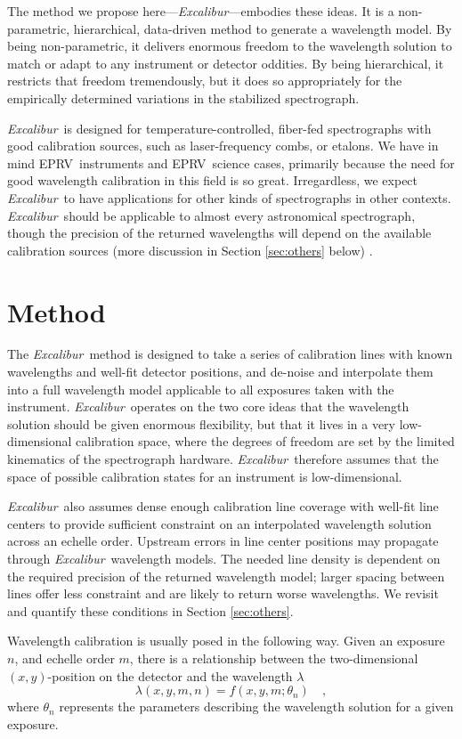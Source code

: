 \documentclass[modern]{aastex63}
\newcommand{\project}[1]{\textsl{#1}}
\newcommand{\name}{\project{Excalibur}}
\newcommand{\acronym}[1]{{\small{#1}}}
\newcommand{\eprv}{\acronym{EPRV}}
\begin{document}
The method we propose here---\name---embodies these ideas.
It is a non-parametric, hierarchical, data-driven method to generate a wavelength model.  By being non-parametric, it delivers enormous freedom to the wavelength solution to match or adapt to any instrument or detector oddities.  By being hierarchical, it restricts that freedom tremendously, but it does so appropriately for the empirically determined variations in the stabilized spectrograph.

\name\ is designed for temperature-controlled, fiber-fed spectrographs with good calibration sources, such as laser-frequency combs, or etalons.  We have in mind \eprv\ instruments and \eprv\ science cases, primarily because the need for good wavelength calibration in this field is so great.  Irregardless, we expect \name\ to have applications for other kinds of spectrographs in other contexts.  \name\ should be applicable to almost every astronomical spectrograph, though the precision of the returned wavelengths will depend on the available calibration sources (more discussion in Section \ref{sec:others} below) .


\section{Method} \label{sec:method}
The \name\ method is designed to take a series of calibration lines with known wavelengths and well-fit detector positions, and de-noise and interpolate them into a full wavelength model applicable to all exposures taken with the instrument.  \name\ operates on the two core ideas that the wavelength solution should be given enormous flexibility, but that it lives in a very low-dimensional calibration space, where the degrees of freedom are set by the limited kinematics of the spectrograph hardware.  \name\ therefore assumes that the space of possible calibration states for an instrument is low-dimensional.

\name\ also assumes dense enough calibration line coverage with well-fit line centers to provide sufficient constraint on an interpolated wavelength solution across an echelle order.  Upstream errors in line center positions may propagate through \name\ wavelength models.  The needed line density is dependent on the required precision of the returned wavelength model; larger spacing between lines offer less constraint and are likely to return worse wavelengths.  We revisit and quantify these conditions in Section \ref{sec:others}.

Wavelength calibration is usually posed in the following way.  Given an exposure $n$, and echelle order $m$, there is a relationship between
the two-dimensional $(x,y)$-position on the detector and the
wavelength $\lambda$
\begin{equation}
\lambda(x,y,m,n) = f(x,y,m;\theta_{n})
\quad ,
\label{eq:wsol}
\end{equation}
where $\theta_{n}$ represents the parameters describing the wavelength solution for a given exposure.
\end{document}
